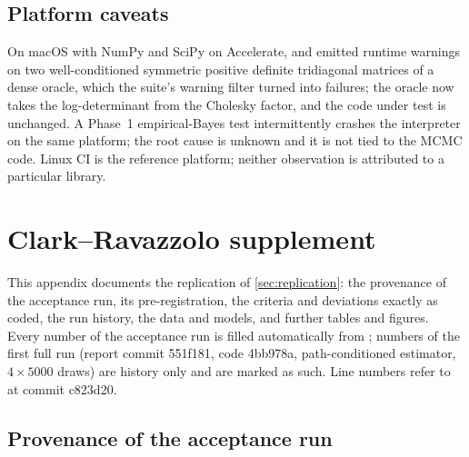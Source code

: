 \subsection{Platform caveats}\label{app:platform}

On macOS with NumPy and SciPy on Accelerate,  and  emitted runtime
warnings on two well-conditioned symmetric positive definite tridiagonal matrices of a dense oracle,
which the suite's warning filter turned into failures; the oracle now takes the log-determinant from
the Cholesky factor, and the code under test is unchanged.
A Phase~1 empirical-Bayes test intermittently crashes the interpreter on the same platform; the root
cause is unknown and it is not tied to the MCMC code.
Linux CI is the reference platform; neither observation is attributed to a particular library.

\clearpage

\section{Clark--Ravazzolo supplement}\label{app:cr}

This appendix documents the replication of \cref{sec:replication}: the provenance of the
acceptance run, its pre-registration, the criteria and deviations exactly as coded, the run history,
the data and models, and further tables and figures.
Every number of the acceptance run is filled automatically from
; numbers of the first full run (report
commit 551f181, code 4bb978a, path-conditioned estimator, $4\times5000$ draws) are history only and
are marked as such.
Line numbers refer to  at commit c823d20.

\subsection{Provenance of the acceptance run}\label{app:cr-provenance}

